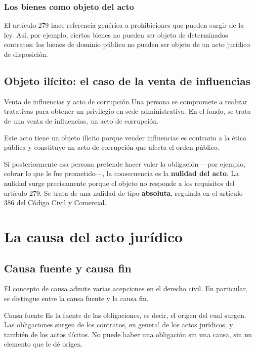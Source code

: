 \documentclass[12pt,oneside]{book}
\begin{document}
\subsection{Los bienes como objeto del acto}

El artículo 279 hace referencia genérica a prohibiciones que pueden surgir de la ley. Así, por ejemplo, ciertos bienes no pueden ser objeto de determinados contratos: los bienes de dominio público no pueden ser objeto de un acto jurídico de disposición.

\section{Objeto ilícito: el caso de la venta de influencias}

\begin{example}{Venta de influencias y acto de corrupción}
Una persona se compromete a realizar tratativas para obtener un privilegio en sede administrativa. En el fondo, se trata de una venta de influencias, un acto de corrupción.

Este acto tiene un objeto ilícito porque vender influencias es contrario a la ética pública y constituye un acto de corrupción que afecta el orden público.

Si posteriormente esa persona pretende hacer valer la obligación —por ejemplo, cobrar lo que le fue prometido—, la consecuencia es la \textbf{nulidad del acto}. La nulidad surge precisamente porque el objeto no responde a los requisitos del artículo 279. Se trata de una nulidad de tipo \textbf{absoluta}, regulada en el artículo 386 del Código Civil y Comercial.
\end{example}
\chapter{La causa del acto jurídico}
\label{ch:causa}

\section{Causa fuente y causa fin}

El concepto de causa admite varias acepciones en el derecho civil. En particular, se distingue entre la causa fuente y la causa fin.

\begin{definition}{Causa fuente}
Es la fuente de las obligaciones, es decir, el origen del cual surgen. Las obligaciones surgen de los contratos, en general de los actos jurídicos, y también de los actos ilícitos. No puede haber una obligación sin una causa, sin un elemento que le dé origen.
\end{definition}
\end{document}
